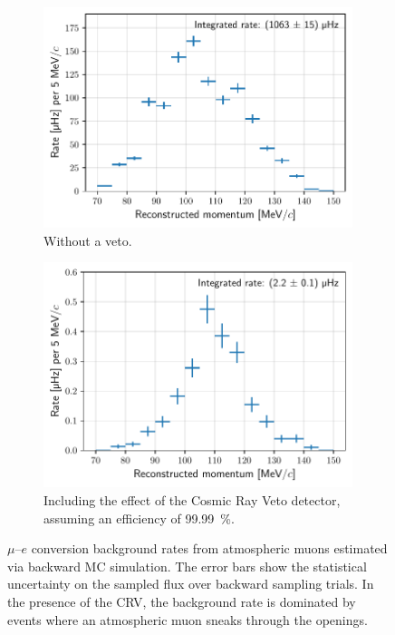 \begin{figure}[t]
    \centering
    \begin{subfigure}[t]{0.48\textwidth}
        \centering
        \includegraphics[width=0.99\textwidth]{chapter5/bmc_background_rate_no_crv.pdf}
        \caption{Without a veto.}
        \label{fig:bmc_rate_vs_momentum_no_crv}
    \end{subfigure}
    \hfill
    \begin{subfigure}[t]{0.48\textwidth}
        \centering
        \includegraphics[width=0.99\textwidth]{chapter5/bmc_background_rate_with_crv.pdf}
        \caption{Including the effect of the Cosmic Ray Veto detector, assuming
        an efficiency of \SI{99.99}{\percent}.}
        \label{fig:bmc_rate_vs_momentum_crv}
    \end{subfigure}
    \caption{ 
        $\mu$--$e$ conversion background rates from atmospheric muons
        estimated via backward MC simulation. The error bars show the
        statistical uncertainty on the sampled flux over backward sampling
        trials. In the presence of the CRV, the background rate is dominated by
        events where an atmospheric muon sneaks through the openings. }
        \label{fig:bmc_rate_vs_momentum}
\end{figure}

